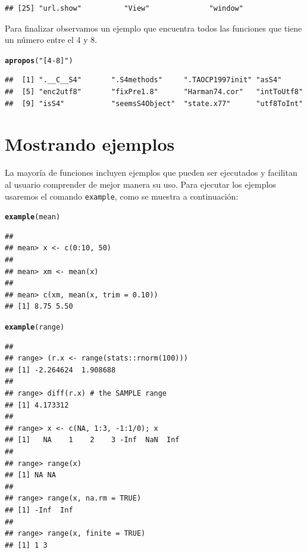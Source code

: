 \documentclass[11pt,a4paper,oneside]{book}\usepackage[]{graphicx}\usepackage[]{color}
\makeatletter
\newcommand{\hlstr}[1]{\textcolor[rgb]{0.192,0.494,0.8}{#1}}%
\newcommand{\hlstd}[1]{\textcolor[rgb]{0.345,0.345,0.345}{#1}}%
\newcommand{\hlkwd}[1]{\textcolor[rgb]{0.737,0.353,0.396}{\textbf{#1}}}%
\newenvironment{kframe}{%
 \def\at@end@of@kframe{}%
 \ifinner\ifhmode%
  \def\at@end@of@kframe{\end{minipage}}%
  \begin{minipage}{\columnwidth}%
 \fi\fi%
 \def\FrameCommand##1{\hskip\@totalleftmargin \hskip-\fboxsep
 \colorbox{shadecolor}{##1}\hskip-\fboxsep
     \hskip-\linewidth \hskip-\@totalleftmargin \hskip\columnwidth}%
 \MakeFramed {\advance\hsize-\width
   \@totalleftmargin\z@ \linewidth\hsize
   \@setminipage}}%
 {\par\unskip\endMakeFramed%
 \at@end@of@kframe}
\newenvironment{knitrout}{}{} %
\makeatother
\begin{document}
\begin{itemize}
\begin{knitrout}
\begin{kframe}
\begin{verbatim}
## [25] "url.show"          "View"              "window"
\end{verbatim}
\end{kframe}
\end{knitrout}
Para finalizar observamos un ejemplo que encuentra todos las funciones que tiene un número entre el 4 y 8.
\begin{knitrout}
\color{fgcolor}\begin{kframe}
\begin{alltt}
\hlkwd{apropos}\hlstd{(}\hlstr{"[4-8]"}\hlstd{)}
\end{alltt}
\begin{verbatim}
##  [1] ".__C__S4"       ".S4methods"     ".TAOCP1997init" "asS4"          
##  [5] "enc2utf8"       "fixPre1.8"      "Harman74.cor"   "intToUtf8"     
##  [9] "isS4"           "seemsS4Object"  "state.x77"      "utf8ToInt"
\end{verbatim}
\end{kframe}
\end{knitrout}


\section{Mostrando ejemplos}

La mayoría de funciones incluyen ejemplos que pueden ser ejecutados y facilitan al usuario comprender de mejor manera su uso. Para ejecutar los ejemplos usaremos el comando \texttt{example}, como se muestra a continuación:
\begin{knitrout}
\color{fgcolor}\begin{kframe}
\begin{alltt}
\hlkwd{example}\hlstd{(mean)}
\end{alltt}
\begin{verbatim}
## 
## mean> x <- c(0:10, 50)
## 
## mean> xm <- mean(x)
## 
## mean> c(xm, mean(x, trim = 0.10))
## [1] 8.75 5.50
\end{verbatim}
\begin{alltt}
\hlkwd{example}\hlstd{(range)}
\end{alltt}
\begin{verbatim}
## 
## range> (r.x <- range(stats::rnorm(100)))
## [1] -2.264624  1.908688
## 
## range> diff(r.x) # the SAMPLE range
## [1] 4.173312
## 
## range> x <- c(NA, 1:3, -1:1/0); x
## [1]   NA    1    2    3 -Inf  NaN  Inf
## 
## range> range(x)
## [1] NA NA
## 
## range> range(x, na.rm = TRUE)
## [1] -Inf  Inf
## 
## range> range(x, finite = TRUE)
## [1] 1 3
\end{verbatim}
\end{kframe}
\end{knitrout}





\end{itemize}
\end{document}
